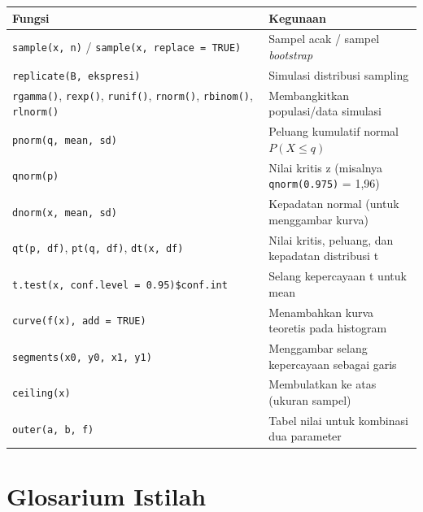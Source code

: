 \documentclass[
  indonesian,
  letterpaper,
]{book}
\newcounter{none} %
\begin{document}
{\def\LTcaptype{none} %
\begin{longtable}[]{@{}
  >{\raggedright\arraybackslash}p{}
  >{\raggedright\arraybackslash}p{}@{}}
\toprule\noalign{}
\begin{minipage}[b]{\linewidth}\raggedright
Fungsi
\end{minipage} & \begin{minipage}[b]{\linewidth}\raggedright
Kegunaan
\end{minipage} \\
\midrule\noalign{}
\endhead
\bottomrule\noalign{}
\endlastfoot
\texttt{sample(x,\ n)} / \texttt{sample(x,\ replace\ =\ TRUE)} & Sampel
acak / sampel \emph{bootstrap} \\
\texttt{replicate(B,\ ekspresi)} & Simulasi distribusi sampling \\
\texttt{rgamma()}, \texttt{rexp()}, \texttt{runif()}, \texttt{rnorm()},
\texttt{rbinom()}, \texttt{rlnorm()} & Membangkitkan populasi/data
simulasi \\
\texttt{pnorm(q,\ mean,\ sd)} & Peluang kumulatif normal
\(P(X \leq q)\) \\
\texttt{qnorm(p)} & Nilai kritis z (misalnya \texttt{qnorm(0.975)} =
1,96) \\
\texttt{dnorm(x,\ mean,\ sd)} & Kepadatan normal (untuk menggambar
kurva) \\
\texttt{qt(p,\ df)}, \texttt{pt(q,\ df)}, \texttt{dt(x,\ df)} & Nilai
kritis, peluang, dan kepadatan distribusi t \\
\texttt{t.test(x,\ conf.level\ =\ 0.95)\$conf.int} & Selang kepercayaan
t untuk mean \\
\texttt{curve(f(x),\ add\ =\ TRUE)} & Menambahkan kurva teoretis pada
histogram \\
\texttt{segments(x0,\ y0,\ x1,\ y1)} & Menggambar selang kepercayaan
sebagai garis \\
\texttt{ceiling(x)} & Membulatkan ke atas (ukuran sampel) \\
\texttt{outer(a,\ b,\ f)} & Tabel nilai untuk kombinasi dua parameter \\
\end{longtable}
}


\chapter{Glosarium Istilah}\label{glosarium-istilah}
\end{document}
